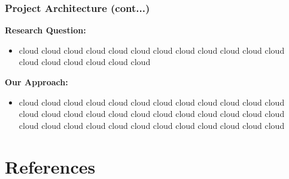 \documentclass{beamer}
\begin{document}
\begin{frame}
\frametitle{Project Architecture (cont...)}
\textbf{Research Question:}
\begin{itemize}
  \item cloud cloud cloud cloud cloud cloud cloud cloud cloud cloud cloud cloud cloud cloud cloud cloud cloud cloud
\end{itemize}

\textbf{Our Approach:}
\begin{itemize}
  \item cloud cloud cloud cloud cloud cloud cloud cloud cloud cloud cloud cloud cloud cloud cloud cloud cloud cloud cloud cloud cloud cloud cloud cloud cloud cloud cloud cloud cloud cloud cloud cloud cloud cloud cloud cloud
\end{itemize}
\end{frame}

\section{References}
\begin{frame}
\printbibliography[heading=none] 
\end{frame}
\end{document}

